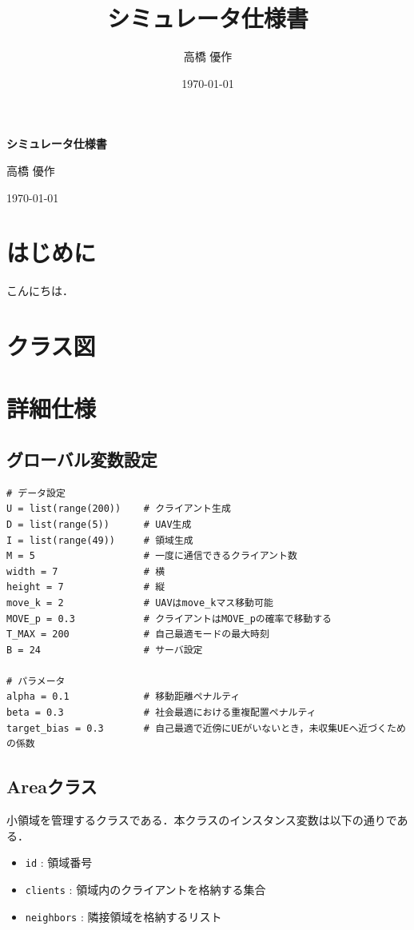 \documentclass[11pt]{jsarticle}
\title{シミュレータ仕様書}
\author{高橋 優作}
\date{\today}
\begin{document}
\begin{titlepage}
    \centering
    \vspace*{35mm}
    {\Huge \bfseries シミュレータ仕様書 \par}
    \vspace{25mm}
    {\Large 高橋 優作 \par}
    \vspace{10mm}
    {\Large \today \par}
    \vfill
\end{titlepage}

\tableofcontents
\newpage

\section{はじめに}
こんにちは．

\section{クラス図}


\section{詳細仕様}
\subsection{グローバル変数設定}

\begin{lstlisting}[caption=Global Variable]
# データ設定
U = list(range(200))    # クライアント生成
D = list(range(5))      # UAV生成
I = list(range(49))     # 領域生成
M = 5                   # 一度に通信できるクライアント数
width = 7               # 横
height = 7              # 縦
move_k = 2              # UAVはmove_kマス移動可能
MOVE_p = 0.3            # クライアントはMOVE_pの確率で移動する
T_MAX = 200             # 自己最適モードの最大時刻
B = 24                  # サーバ設定

# パラメータ
alpha = 0.1             # 移動距離ペナルティ
beta = 0.3              # 社会最適における重複配置ペナルティ
target_bias = 0.3       # 自己最適で近傍にUEがいないとき，未収集UEへ近づくための係数
\end{lstlisting}

\subsection{Areaクラス}
小領域を管理するクラスである．本クラスのインスタンス変数は以下の通りである．
\begin{itemize}
    \item \verb|id| : 領域番号
    \item \verb|clients| : 領域内のクライアントを格納する集合
    \item \verb|neighbors| : 隣接領域を格納するリスト
\end{itemize}
\end{document}
